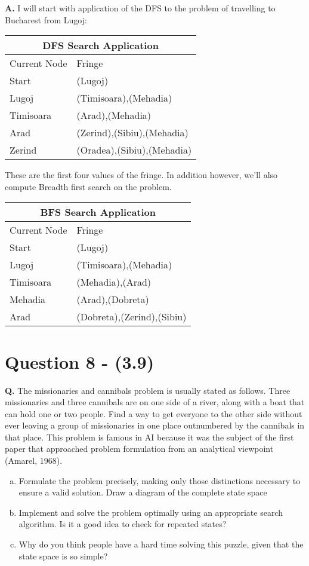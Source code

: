 \documentclass[12pt]{amsart}
\begin{document}
\textbf{A.} I will start with application of the DFS to the problem of travelling to Bucharest from Lugoj:\hfill \break
\begin{tabular}{ |p{1.7cm}||p{14.5cm}| }
 \hline
 \multicolumn{2}{|c|}{DFS Search Application} \\
 \hline
Current Node & Fringe \\
 \hline
Start   & {(Lugoj)} \\
Lugoj &   {(Timisoara),(Mehadia)}  \\
Timisoara & {(Arad),(Mehadia)}  \\
Arad   & {(Zerind),(Sibiu),(Mehadia)} \\
Zerind &   {(Oradea),(Sibiu),(Mehadia)}  \\
 \hline
\end{tabular}
These are the first four values of the fringe. In addition however, we'll also compute Breadth first search on the problem. \hfill \break
\begin{tabular}{ |p{1.7cm}||p{14.5cm}| }
 \hline
 \multicolumn{2}{|c|}{BFS Search Application} \\
 \hline
Current Node & Fringe \\
 \hline
Start   & {(Lugoj)} \\
Lugoj &   {(Timisoara),(Mehadia)}  \\
Timisoara & {(Mehadia),(Arad)}  \\
Mehadia  & {(Arad),(Dobreta)} \\
Arad &   {(Dobreta),(Zerind),(Sibiu)}  \\
 \hline
\end{tabular}
\hfill \break

\section*{Question 8 - (3.9)}
\textbf{Q.} The missionaries and cannibals problem is usually stated as follows. Three missionaries and three cannibals are on one side of a river, along with a boat that can hold one or two people. Find a way to get everyone to the other side without ever leaving a group of missionaries in one place outnumbered by the cannibals in that place. This problem is famous in AI because it was the subject of the first paper that approached problem formulation from an analytical viewpoint (Amarel, 1968).

\begin{enumerate}[a)]
  \item Formulate the problem precisely, making only those distinctions necessary to ensure a valid solution. Draw a diagram of the complete state space

    \item Implement and solve the problem optimally using an appropriate search algorithm. Is it a good idea to check for repeated states?

       \item  Why do you think people have a hard time solving this puzzle, given that the state space is so simple?
       
\end{enumerate} \hfill \break
\end{document}

